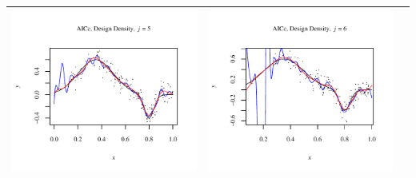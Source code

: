 \documentclass[11pt]{article}
\begin{document}
\begin{table}[h!]
\begin{center}
\begin{tabular}{| >{\centering\arraybackslash}m{2.1in} |  >{\centering\arraybackslash}m{2.1in} |  >{\centering\arraybackslash}m{2.1in}|}
      \includegraphics[width=1\linewidth,height=0.18\textheight]{Graphs/3/2/assignment5_a_3_2_5}&
      \includegraphics[width=1\linewidth,height=0.18\textheight]{Graphs/3/2/assignment5_a_3_2_6}\\\hline
    \end{tabular}
  \end{center}
\end{table}
\end{document}
